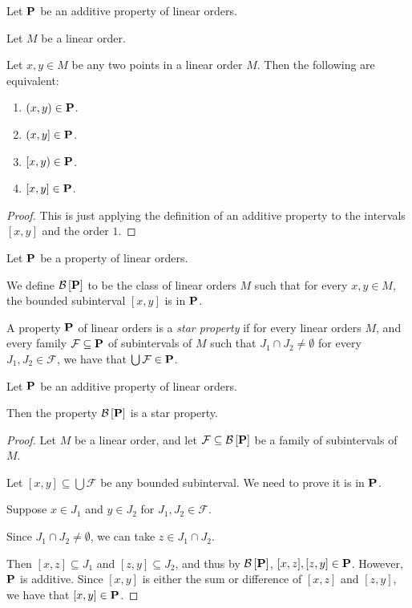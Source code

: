 \begin{corollary}
  Let $\mathbf{P}$ be an additive property of linear orders.

  Let $M$ be a linear order.

  Let $x, y \in M$ be any two points in a linear order $M$.
  Then the following are equivalent:

  \begin{enumerate}
    \item $\left(x, y\right) \in \mathbf{P}$.
    \item $\left(x, y\right] \in \mathbf{P}$.
    \item $\left[x, y\right) \in \mathbf{P}$.
    \item $\left[x, y\right] \in \mathbf{P}$.
  \end{enumerate}
\end{corollary}

\begin{proof}
  This is just applying the definition of an additive property
  to the intervals $\left[x, y\right]$ and the order $1$.
\end{proof}

\begin{definition}
  Let $\mathbf{P}$ be a property of linear orders.

  We define $\mathcal{B} \left[ {{\mathbf{P}}} \right]$ to be the class of linear orders $M$ such that for every $x, y \in M$,
  the bounded subinterval $[x, y]$ is in $\mathbf{P}$.
\end{definition}

\begin{definition}
  A property $\mathbf{P}$ of linear orders is a \emph{star property} if
  for every linear orders $M$, and every family $\mathcal{F} \subseteq \mathbf{P}$
  of subintervals of $M$ such that $J_1 \cap J_2 \ne \emptyset$
  for every $J_1, J_2 \in \mathcal{F}$, we have that
  $\bigcup \mathcal{F} \in \mathbf{P}$.
\end{definition}

\begin{lemma}\label{star-lemma}
  Let $\mathbf{P}$ be an additive property of linear orders.

  Then the property $\mathcal{B} \left[ {{\mathbf{P}}} \right]$ is a star property.
\end{lemma}

\begin{proof}
  Let $M$ be a linear order,
  and let $\mathcal{F} \subseteq \mathcal{B} \left[ {{\mathbf{P}}} \right]$ be a family of subintervals of $M$.

  Let $[x, y] \subseteq \bigcup \mathcal{F}$ be any bounded subinterval. We need to prove
  it is in $\mathbf{P}$.

  Suppose $x \in J_1$ and $y \in J_2$ for $J_1, J_2 \in \mathcal{F}$.

  Since $J_1 \cap J_2 \ne \emptyset$, we can take $z \in J_1 \cap J_2$.

  Then $[x, z] \subseteq J_1$ and $[z, y] \subseteq J_2$,
  and thus by $\mathcal{B} \left[ {{\mathbf{P}}} \right]$, $[x, z], [z, y] \in \mathbf{P}$.
  However, $\mathbf{P}$ is additive. Since $[x, y]$ is either the sum
  or difference of $[x, z]$ and $[z, y]$, we have that $[x, y] \in \mathbf{P}$.
\end{proof}

